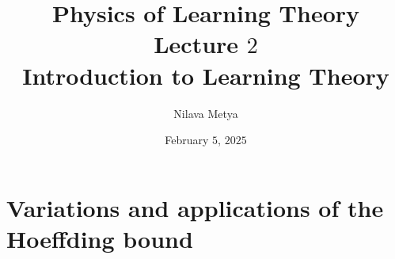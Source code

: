 
\usepackage{wrapfig}
\setlength{\columnsep}{0.7cm}


\usepackage[
backend=biber,
style=alphabetic,
]{biblatex}

\title{\textbf{Physics of Learning Theory}\\ Lecture $2$ \\
Introduction to Learning Theory}
\usepackage{quiver}
\usepackage[nobottomtitles*]{titlesec}
\usepackage{titletoc}
\author{Nilava Metya}
\date{\vspace{-0.7in}February $5$, $2025$}
\usepackage{pdfpages}
\usepackage{fancyhdr}
	\pagestyle{fancyplain}
	\fancyhf{}
	\fancyhead[R]{\thepage}
\newcommand{\fa}{~\forall~}
\usepackage{algpseudocode}
\renewcommand{\algorithmicrequire}{\textbf{Input:}}
\renewcommand{\algorithmicensure}{\textbf{Output:}}


\maketitle

\section{Variations and applications of the Hoeffding bound}

